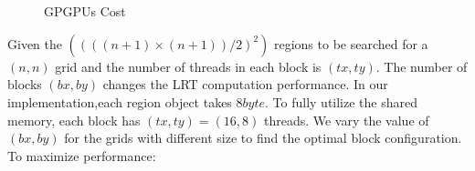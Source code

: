 \documentclass[10pt,journal,cspaper,compsoc]{IEEEtran}
\begin{document}
\begin{figure}[h]
{\label{gpu:subfig3}
}\\
~~
\caption{GPGPUs Cost}\label{gpgpus}
\end{figure}

Given the $((((n+1)\times(n+1))/2)^2)$ regions to be searched for a $(n,n)$ grid and the number of threads in each block is $(tx,ty)$. The number of blocks $(bx,by)$ changes the LRT computation performance. In our implementation,each region object takes $8byte$. To fully utilize the shared memory, each block has $(tx,ty)=(16,8)$ threads. We vary the value of $(bx,by)$ for the grids with different size to find the optimal block configuration. To maximize performance:
\end{document}
